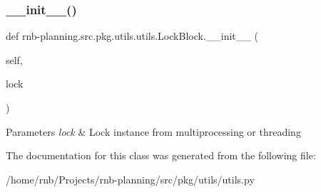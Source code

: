 \subsubsection{\texorpdfstring{\+\_\+\+\_\+init\+\_\+\+\_\+()}{\_\_init\_\_()}}
{\footnotesize\ttfamily def rnb-\/planning.\+src.\+pkg.\+utils.\+utils.\+Lock\+Block.\+\_\+\+\_\+init\+\_\+\+\_\+ (\begin{DoxyParamCaption}\item[{}]{self,  }\item[{}]{lock }\end{DoxyParamCaption})}


\begin{DoxyParams}{Parameters}
{\em lock} & Lock instance from multiprocessing or threading \\
\hline
\end{DoxyParams}


The documentation for this class was generated from the following file\+:\begin{DoxyCompactItemize}
\item 
/home/rnb/\+Projects/rnb-\/planning/src/pkg/utils/utils.\+py\end{DoxyCompactItemize}

